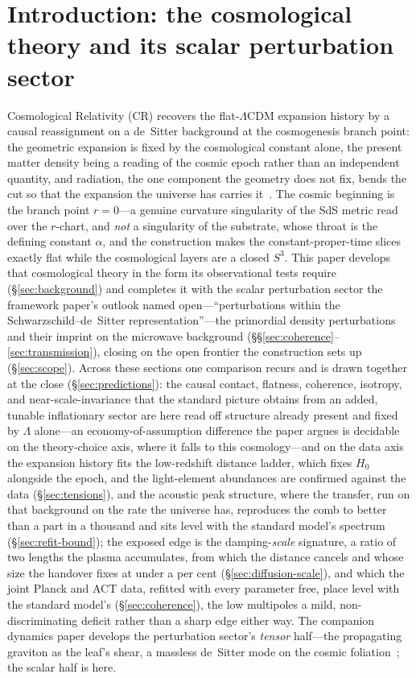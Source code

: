 \documentclass[11pt,a4paper]{article}
\theoremstyle{plain}
\theoremstyle{definition}
\theoremstyle{remark}
\begin{document}
\section{Introduction: the cosmological theory and its scalar perturbation sector}\label{sec:intro}

Cosmological Relativity (CR) recovers the flat-$\Lambda$CDM expansion history by a causal reassignment on a de~Sitter background at the cosmogenesis branch point: the geometric expansion is fixed by the cosmological constant alone, the present matter density being a reading of the cosmic epoch rather than an independent quantity, and radiation, the one component the geometry does not fix, bends the cut so that the expansion the universe has carries it~\cite{JanzenCRframework,JanzenModernParallax}. The cosmic beginning is the branch point $r=0$---a genuine curvature singularity of the SdS metric read over the $r$-chart, and \emph{not} a singularity of the substrate, whose throat is the defining constant $\alpha$, and the construction makes the constant-proper-time slices exactly flat while the cosmological layers are a closed $S^3$. This paper develops that cosmological theory in the form its observational tests require (\S\ref{sec:background}) and completes it with the scalar perturbation sector the framework paper's outlook named open---``perturbations within the Schwarzschild--de~Sitter representation''---the primordial density perturbations and their imprint on the microwave background (\S\S\ref{sec:coherence}--\ref{sec:transmission}), closing on the open frontier the construction sets up (\S\ref{sec:scope}). Across these sections one comparison recurs and is drawn together at the close (\S\ref{sec:predictions}): the causal contact, flatness, coherence, isotropy, and near-scale-invariance that the standard picture obtains from an added, tunable inflationary sector are here read off structure already present and fixed by $\Lambda$ alone---an economy-of-assumption difference the paper argues is decidable on the theory-choice axis, where it falls to this cosmology---and on the data axis the expansion history fits the low-redshift distance ladder, which fixes $H_0$ alongside the epoch, and the light-element abundances are confirmed against the data (\S\ref{sec:tensions}), and the acoustic peak structure, where the transfer, run on that background on the rate the universe has, reproduces the comb to better than a part in a thousand and sits level with the standard model's spectrum (\S\ref{sec:refit-bound}); the exposed edge is the damping-\emph{scale} signature, a ratio of two lengths the plasma accumulates, from which the distance cancels and whose size the handover fixes at under a per cent (\S\ref{sec:diffusion-scale}), and which the joint Planck and ACT data, refitted with every parameter free, place level with the standard model's (\S\ref{sec:coherence}), the low multipoles a mild, non-discriminating deficit rather than a sharp edge either way. The companion dynamics paper develops the perturbation sector's \emph{tensor} half---the propagating graviton as the leaf's shear, a massless de~Sitter mode on the cosmic foliation~\cite{JanzenDynamics}; the scalar half is here.
\end{document}
